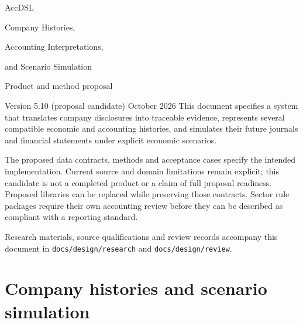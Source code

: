 \documentclass[11pt,a4paper]{report}
\newcommand{\code}[1]{\texttt{#1}}
\begin{document}
\hypersetup{pageanchor=false}
\begin{titlepage}
\vspace*{20mm}
{\sffamily\color{ink}\Huge AccDSL\par}
\vspace{7mm}
{\LARGE Company Histories,\par Accounting Interpretations,\par and Scenario Simulation\par}
\vspace{12mm}
{\Large Product and method proposal\par}
\vspace{5mm}
Version 5.10 (proposal candidate)  October 2026
\vfill
This document specifies a system that translates company disclosures into
traceable evidence, represents several compatible economic and accounting
histories, and simulates their future journals and financial statements under
explicit economic scenarios.

The proposed data contracts, methods and acceptance cases specify the intended
implementation. Current source and domain limitations remain explicit; this
candidate is not a completed product or a claim of full proposal readiness. Proposed libraries can be replaced while preserving those
contracts. Sector rule packages require their own accounting review before
they can be described as compliant with a reporting standard.

\vspace{8mm}
Research materials, source qualifications and review records accompany this
document in \code{docs/design/research} and \code{docs/design/review}.
\end{titlepage}
\hypersetup{pageanchor=true}
\tableofcontents
\clearpage{}
\part{Company histories and scenario simulation}


























\clearpage\label{sim:body-end}
\end{document}
